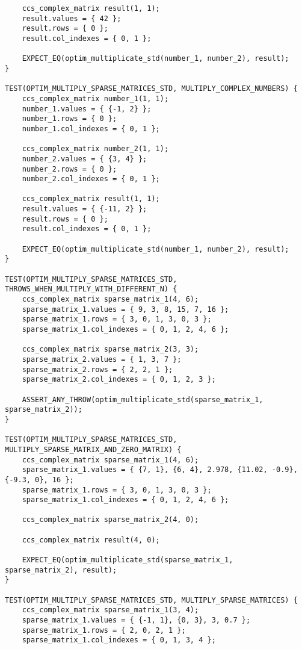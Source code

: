 \documentclass{report}
\begin{document}
\begin{lstlisting}
    ccs_complex_matrix result(1, 1);
    result.values = { 42 };
    result.rows = { 0 };
    result.col_indexes = { 0, 1 };

    EXPECT_EQ(optim_multiplicate_std(number_1, number_2), result);
}

TEST(OPTIM_MULTIPLY_SPARSE_MATRICES_STD, MULTIPLY_COMPLEX_NUMBERS) {
    ccs_complex_matrix number_1(1, 1);
    number_1.values = { {-1, 2} };
    number_1.rows = { 0 };
    number_1.col_indexes = { 0, 1 };

    ccs_complex_matrix number_2(1, 1);
    number_2.values = { {3, 4} };
    number_2.rows = { 0 };
    number_2.col_indexes = { 0, 1 };

    ccs_complex_matrix result(1, 1);
    result.values = { {-11, 2} };
    result.rows = { 0 };
    result.col_indexes = { 0, 1 };

    EXPECT_EQ(optim_multiplicate_std(number_1, number_2), result);
}

TEST(OPTIM_MULTIPLY_SPARSE_MATRICES_STD, THROWS_WHEN_MULTIPLY_WITH_DIFFERENT_N) {
    ccs_complex_matrix sparse_matrix_1(4, 6);
    sparse_matrix_1.values = { 9, 3, 8, 15, 7, 16 };
    sparse_matrix_1.rows = { 3, 0, 1, 3, 0, 3 };
    sparse_matrix_1.col_indexes = { 0, 1, 2, 4, 6 };

    ccs_complex_matrix sparse_matrix_2(3, 3);
    sparse_matrix_2.values = { 1, 3, 7 };
    sparse_matrix_2.rows = { 2, 2, 1 };
    sparse_matrix_2.col_indexes = { 0, 1, 2, 3 };

    ASSERT_ANY_THROW(optim_multiplicate_std(sparse_matrix_1, sparse_matrix_2));
}

TEST(OPTIM_MULTIPLY_SPARSE_MATRICES_STD, MULTIPLY_SPARSE_MATRIX_AND_ZERO_MATRIX) {
    ccs_complex_matrix sparse_matrix_1(4, 6);
    sparse_matrix_1.values = { {7, 1}, {6, 4}, 2.978, {11.02, -0.9}, {-9.3, 0}, 16 };
    sparse_matrix_1.rows = { 3, 0, 1, 3, 0, 3 };
    sparse_matrix_1.col_indexes = { 0, 1, 2, 4, 6 };

    ccs_complex_matrix sparse_matrix_2(4, 0);

    ccs_complex_matrix result(4, 0);

    EXPECT_EQ(optim_multiplicate_std(sparse_matrix_1, sparse_matrix_2), result);
}

TEST(OPTIM_MULTIPLY_SPARSE_MATRICES_STD, MULTIPLY_SPARSE_MATRICES) {
    ccs_complex_matrix sparse_matrix_1(3, 4);
    sparse_matrix_1.values = { {-1, 1}, {0, 3}, 3, 0.7 };
    sparse_matrix_1.rows = { 2, 0, 2, 1 };
    sparse_matrix_1.col_indexes = { 0, 1, 3, 4 };


\end{lstlisting}
\end{document}

